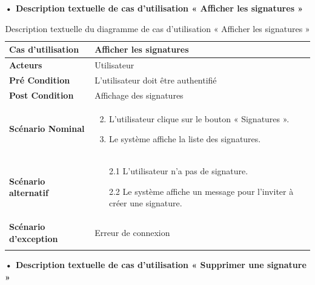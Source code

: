 \textbf{•	Description textuelle de cas d'utilisation « Afficher les signatures »}

\begin{longtable}{|p{5cm}|p{10cm}|}
\hline
\textbf{Cas d'utilisation}&Afficher les signatures\\
\hline
\textbf{Acteurs}&Utilisateur \\
\hline
\textbf{Pré Condition}&L'utilisateur doit être authentifié\\
\hline
\textbf{Post Condition}&Affichage des signatures\\
\hline
\textbf{Scénario Nominal}&
\vspace{-\baselineskip}
\begin{enumerate}
    \setcounter{enumi}{1}
    \item L'utilisateur clique sur le bouton « Signatures ».
    \item Le système affiche la liste des signatures.
\end{enumerate}\\
\hline
\textbf{Scénario alternatif}&
\begin{enumerate}
  \item [2.1] L'utilisateur n'a pas de signature.
  \item [2.2] Le système affiche un message pour l'inviter à créer une signature.
\end{enumerate}\\
\hline
\textbf{Scénario d'exception}&Erreur de connexion\\
\hline
\caption{Description textuelle du diagramme de cas d'utilisation « Afficher les signatures »}
\label{tab:use_case_view_signature}
\end{longtable}


\textbf{•	Description textuelle de cas d'utilisation « Supprimer une signature »}

